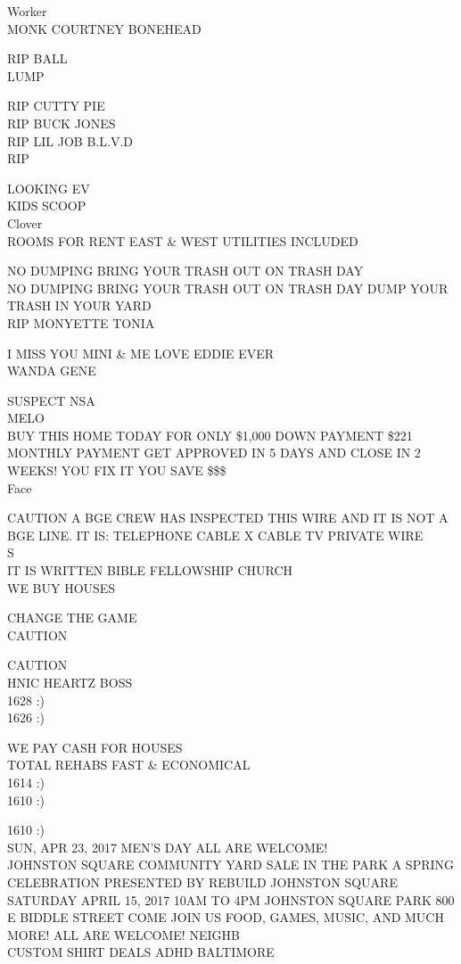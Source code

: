 \documentclass[10pt,letterpaper]{article}
\begin{document}
Worker\\
MONK COURTNEY BONEHEAD

RIP BALL\\
LUMP

RIP CUTTY PIE\\
RIP BUCK JONES\\
RIP LIL JOB B.L.V.D\\
RIP

LOOKING EV\\
KIDS SCOOP\\
Clover\\
ROOMS FOR RENT EAST \& WEST UTILITIES INCLUDED

NO DUMPING BRING YOUR TRASH OUT ON TRASH DAY\\
NO DUMPING BRING YOUR TRASH OUT ON TRASH DAY DUMP YOUR TRASH IN YOUR YARD\\
RIP MONYETTE TONIA

I MISS YOU MINI \& ME LOVE EDDIE EVER\\
WANDA GENE

SUSPECT NSA\\
MELO\\
BUY THIS HOME TODAY FOR ONLY \$1,000 DOWN PAYMENT \$221 MONTHLY PAYMENT GET APPROVED IN 5 DAYS AND CLOSE IN 2 WEEKS!  YOU FIX IT YOU SAVE \$\$\$\\
Face

CAUTION A BGE CREW HAS INSPECTED THIS WIRE AND IT IS NOT A BGE LINE.  IT IS: TELEPHONE CABLE X CABLE TV PRIVATE WIRE\\
S\\
IT IS WRITTEN BIBLE FELLOWSHIP CHURCH\\
WE BUY HOUSES

CHANGE THE GAME\\
CAUTION

CAUTION\\
HNIC HEARTZ BOSS\\
1628 :)\\
1626 :)

WE PAY CASH FOR HOUSES\\
TOTAL REHABS FAST \& ECONOMICAL\\
1614 :)\\
1610 :)

1610 :)\\
SUN, APR 23, 2017 MEN'S DAY ALL ARE WELCOME!\\
JOHNSTON SQUARE COMMUNITY YARD SALE IN THE PARK A SPRING CELEBRATION PRESENTED BY REBUILD JOHNSTON SQUARE SATURDAY APRIL 15, 2017 10AM TO 4PM JOHNSTON SQUARE PARK 800 E BIDDLE STREET COME JOIN US FOOD, GAMES, MUSIC, AND MUCH MORE! ALL ARE WELCOME!  NEIGHB\\
CUSTOM SHIRT DEALS ADHD BALTIMORE
\end{document}
